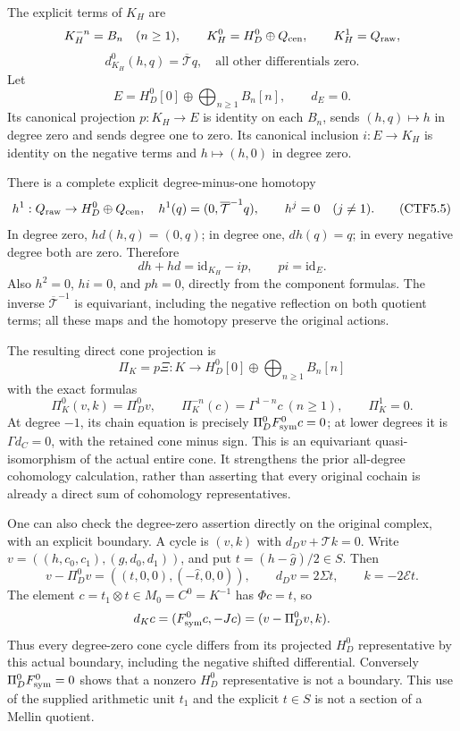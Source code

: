 The explicit terms of \(K_H\) are \[
K_H^{-n}=B_n\quad(n\ge1),\qquad
K_H^0=H_D^0\oplus Q_{\rm cen},\qquad
K_H^1=Q_{\rm raw},
\] \[
d_{K_H}^0(h,q)=\overline{\mathcal T}q,
\quad\text{all other differentials zero}.
\tag{CTF5.3}
\] Let \[
E=H_D^0[0]\oplus\bigoplus_{n\ge1}B_n[n],
\qquad d_E=0.
\tag{CTF5.4}
\] Its canonical projection \(p:K_H\to E\) is identity on each \(B_n\),
sends \((h,q)\mapsto h\) in degree zero and sends degree one to zero.
Its canonical inclusion \(i:E\to K_H\) is identity on the negative terms
and \(h\mapsto(h,0)\) in degree zero.

There is a complete explicit degree-minus-one homotopy \[
h^1:Q_{\rm raw}\to H_D^0\oplus Q_{\rm cen},\quad
h^1(q)=(0,\overline{\mathcal T}^{-1}q),\qquad
h^j=0\quad(j\ne1).
\tag{CTF5.5}
\] In degree zero, \(hd(h,q)=(0,q)\); in degree one, \(dh(q)=q\); in
every negative degree both are zero. Therefore \[
\boxed{dh+hd=\mathrm{id}_{K_H}-ip,\qquad pi=\mathrm{id}_E.}
\tag{CTF5.6}
\] Also \(h^2=0\), \(hi=0\), and \(ph=0\), directly from the component
formulas. The inverse \(\overline{\mathcal T}^{-1}\) is equivariant,
including the negative reflection on both quotient terms; all these maps
and the homotopy preserve the original actions.

The resulting direct cone projection is \[
\boxed{\Pi_K=p\Xi:K\longrightarrow
H_D^0[0]\oplus\bigoplus_{n\ge1}B_n[n]}
\tag{CTF5.7}
\] with the exact formulas \[
\Pi_K^0(v,k)=\Pi_D^0v,\qquad
\Pi_K^{-n}(c)=\Gamma^{1-n}c\ (n\ge1),\qquad
\Pi_K^1=0.
\tag{CTF5.8}
\] At degree \(-1\), its chain equation is precisely
\(\Pi_D^0F_{\rm sym}^0c=0\); at lower degrees it is \(\Gamma d_C=0\),
with the retained cone minus sign. This is an equivariant
quasi-isomorphism of the actual entire cone. It strengthens the prior
all-degree cohomology calculation, rather than asserting that every
original cochain is already a direct sum of cohomology representatives.

One can also check the degree-zero assertion directly on the original
complex, with an explicit boundary. A cycle is \((v,k)\) with
\(d_Dv+\mathcal Tk=0\). Write \(v=((h,c_0,c_1),(g,d_0,d_1))\), and put
\(t=(h-\widehat g)/2\in S\). Then \[
v-\Pi_D^0v=((t,0,0),(-\widehat t,0,0)),\qquad
d_Dv=2\Sigma t,\qquad k=-2\mathcal Et.
\] The element \(c=t_1\otimes t\in M_0=C^0=K^{-1}\) has \(\Phi c=t\), so
\[
d_Kc=(F_{\rm sym}^0c,-Jc)
=(v-\Pi_D^0v,k).
\] Thus every degree-zero cone cycle differs from its projected
\(H_D^0\) representative by this actual boundary, including the negative
shifted differential. Conversely \(\Pi_D^0F_{\rm sym}^0=0\) shows that a
nonzero \(H_D^0\) representative is not a boundary. This use of the
supplied arithmetic unit \(t_1\) and the explicit \(t\in S\) is not a
section of a Mellin quotient.

